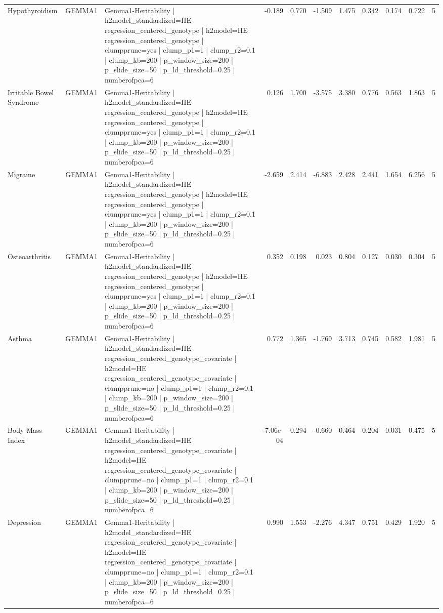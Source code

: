 \begin{landscape}
\begin{longtable}{p{2.4cm}p{1.8cm}p{6.0cm}rrrrrrrr}
Hypothyroidism & GEMMA1 & Gemma1-Heritability | h2model\_standardized=HE regression\_centered\_genotype | h2model=HE regression\_centered\_genotype | clumpprune=yes | clump\_p1=1 | clump\_r2=0.1 | clump\_kb=200 | p\_window\_size=200 | p\_slide\_size=50 | p\_ld\_threshold=0.25 | numberofpca=6 & -0.189 & 0.770 & -1.509 & 1.475 & 0.342 & 0.174 & 0.722 & 5 \\
Irritable Bowel Syndrome & GEMMA1 & Gemma1-Heritability | h2model\_standardized=HE regression\_centered\_genotype | h2model=HE regression\_centered\_genotype | clumpprune=yes | clump\_p1=1 | clump\_r2=0.1 | clump\_kb=200 | p\_window\_size=200 | p\_slide\_size=50 | p\_ld\_threshold=0.25 | numberofpca=6 & 0.126 & 1.700 & -3.575 & 3.380 & 0.776 & 0.563 & 1.863 & 5 \\
Migraine & GEMMA1 & Gemma1-Heritability | h2model\_standardized=HE regression\_centered\_genotype | h2model=HE regression\_centered\_genotype | clumpprune=yes | clump\_p1=1 | clump\_r2=0.1 | clump\_kb=200 | p\_window\_size=200 | p\_slide\_size=50 | p\_ld\_threshold=0.25 | numberofpca=6 & -2.659 & 2.414 & -6.883 & 2.428 & 2.441 & 1.654 & 6.256 & 5 \\
Osteoarthritis & GEMMA1 & Gemma1-Heritability | h2model\_standardized=HE regression\_centered\_genotype | h2model=HE regression\_centered\_genotype | clumpprune=yes | clump\_p1=1 | clump\_r2=0.1 | clump\_kb=200 | p\_window\_size=200 | p\_slide\_size=50 | p\_ld\_threshold=0.25 | numberofpca=6 & 0.352 & 0.198 & 0.023 & 0.804 & 0.127 & 0.030 & 0.304 & 5 \\
Asthma & GEMMA1 & Gemma1-Heritability | h2model\_standardized=HE regression\_centered\_genotype\_covariate | h2model=HE regression\_centered\_genotype\_covariate | clumpprune=no | clump\_p1=1 | clump\_r2=0.1 | clump\_kb=200 | p\_window\_size=200 | p\_slide\_size=50 | p\_ld\_threshold=0.25 | numberofpca=6 & 0.772 & 1.365 & -1.769 & 3.713 & 0.745 & 0.582 & 1.981 & 5 \\
Body Mass Index & GEMMA1 & Gemma1-Heritability | h2model\_standardized=HE regression\_centered\_genotype\_covariate | h2model=HE regression\_centered\_genotype\_covariate | clumpprune=no | clump\_p1=1 | clump\_r2=0.1 | clump\_kb=200 | p\_window\_size=200 | p\_slide\_size=50 | p\_ld\_threshold=0.25 | numberofpca=6 & -7.06e-04 & 0.294 & -0.660 & 0.464 & 0.204 & 0.031 & 0.475 & 5 \\
Depression & GEMMA1 & Gemma1-Heritability | h2model\_standardized=HE regression\_centered\_genotype\_covariate | h2model=HE regression\_centered\_genotype\_covariate | clumpprune=no | clump\_p1=1 | clump\_r2=0.1 | clump\_kb=200 | p\_window\_size=200 | p\_slide\_size=50 | p\_ld\_threshold=0.25 | numberofpca=6 & 0.990 & 1.553 & -2.276 & 4.347 & 0.751 & 0.429 & 1.920 & 5 \\

\end{longtable}
\end{landscape}
